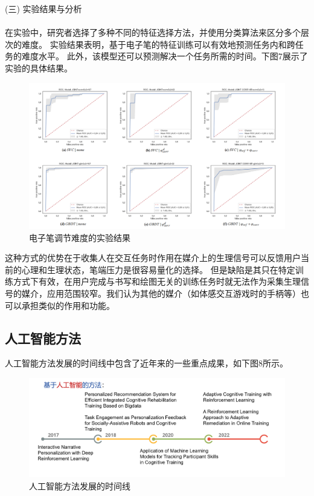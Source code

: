 \documentclass[12pt]{article}
\begin{document}
            (三) 实验结果与分析\paragraph{}
            在实验中，研究者选择了多种不同的特征选择方法，并使用分类算法来区分多个层次的难度。
            实验结果表明，基于电子笔的特征训练可以有效地预测任务内和跨任务的难度水平。
            此外，该模型还可以预测解决一个任务所需的时间。下图7展示了实验的具体结果。

            \begin{figure}[H]
        
            	\centering
            	\includegraphics[scale=0.3]{images/pen_result.png}
            	\caption{电子笔调节难度的实验结果}
            	\label{fig:label}
            \end{figure}

            这种方式的优势在于收集人在交互任务时作用在媒介上的生理信号可以反馈用户当前的心理和生理状态，笔端压力是很容易量化的选择。
            但是缺陷是其只在特定训练方式下有效，在用户完成与书写和绘图无关的训练任务时就无法作为采集生理信号的媒介，应用范围较窄。我们认为其他的媒介（如体感交互游戏时的手柄等）也可以承担类似的作用和功能。
            


            
        \subsection{人工智能方法}
        人工智能方法发展的时间线中包含了近年来的一些重点成果，如下图8所示。

        \begin{figure}[H]
            	
            \centering
            \includegraphics[width=1.0\textwidth]{images/timeline_AI.png}
            \caption{人工智能方法发展的时间线}
            \label{fig:label}
        \end{figure}
\end{document}
